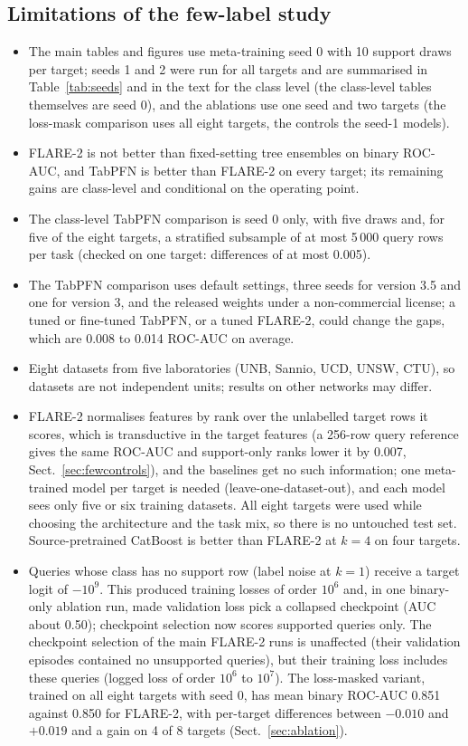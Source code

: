\documentclass[pdflatex,sn-mathphys-num]{sn-jnl}%
\begin{document}
\subsection{Limitations of the few-label study}
\begin{itemize}
\item The main tables and figures use meta-training seed 0 with 10 support draws per target; seeds 1 and 2 were run for all targets and are summarised in Table~\ref{tab:seeds} and in the text for the class level (the class-level tables themselves are seed 0), and the ablations use one seed and two targets (the loss-mask comparison uses all eight targets, the controls the seed-1 models).
\item FLARE-2 is not better than fixed-setting tree ensembles on binary ROC-AUC, and TabPFN is better than FLARE-2 on every target; its remaining gains are class-level and conditional on the operating point.
\item The class-level TabPFN comparison is seed 0 only, with five draws and, for five of the eight targets, a stratified subsample of at most 5\,000 query rows per task (checked on one target: differences of at most 0.005).
\item The TabPFN comparison uses default settings, three seeds for version 3.5 and one for version 3, and the released weights under a non-commercial license; a tuned or fine-tuned TabPFN, or a tuned FLARE-2, could change the gaps, which are 0.008 to 0.014 ROC-AUC on average.
\item Eight datasets from five laboratories (UNB, Sannio, UCD, UNSW, CTU), so datasets are not independent units; results on other networks may differ.
\item FLARE-2 normalises features by rank over the unlabelled target rows it scores, which is transductive in the target features (a 256-row query reference gives the same ROC-AUC and support-only ranks lower it by 0.007, Sect.~\ref{sec:fewcontrols}), and the baselines get no such information; one meta-trained model per target is needed (leave-one-dataset-out), and each model sees only five or six training datasets. All eight targets were used while choosing the architecture and the task mix, so there is no untouched test set. Source-pretrained CatBoost is better than FLARE-2 at $k=4$ on four targets.
\item Queries whose class has no support row (label noise at $k=1$) receive a target logit of $-10^{9}$. This produced training losses of order $10^{6}$ and, in one binary-only ablation run, made validation loss pick a collapsed checkpoint (AUC about 0.50); checkpoint selection now scores supported queries only. The checkpoint selection of the main FLARE-2 runs is unaffected (their validation episodes contained no unsupported queries), but their training loss includes these queries (logged loss of order $10^{6}$ to $10^{7}$). The loss-masked variant, trained on all eight targets with seed 0, has mean binary ROC-AUC 0.851 against 0.850 for FLARE-2, with per-target differences between $-0.010$ and $+0.019$ and a gain on 4 of 8 targets (Sect.~\ref{sec:ablation}).

\end{itemize}
\end{document}
